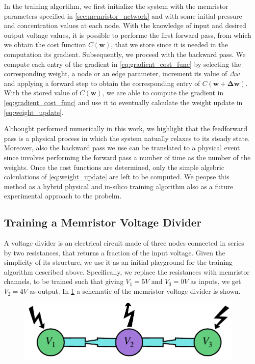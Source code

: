 \documentclass[reprint,superscriptaddress,prb,showkeys]{revtex4-2}
\newcommand{\brac}[1]{\left(#1 \right)} %
\begin{document}
In the training algortihm, we first initialize the system with the memristor parameters specified in \cref{sec:memristor_network} and with some initial pressure and concentration values at each node. With the knowledge of input and desired output voltage values, it is possible to performe the first forward pass, from which we obtain the cost function $C\brac{\boldsymbol{w}}$, that we store since it is needed in the computation its gradient. Subsequently, we proceed with the backward pass. We compute each entry of the gradient in \cref{eq:gradient_cost_func} by selecting the corresponding weight, a node or an edge parameter, increment its value of $\Delta w$ and applying a forward step to obtain the corresponding entry of $C\brac{\boldsymbol{w}+\boldsymbol{\Delta w}}$. With the stored value of $C\brac{\boldsymbol{w}}$, we are able to compute the gradient in \cref{eq:gradient_cost_func} and use it to eventually calculate the weight update in \cref{eq:weight_update}.

Althought performed numerically in this work, we highlight that the feedforward pass is a physical process in which the system natually relaxes to its steady state. Moreover, also the backward pass we use can be translated to a physical event since involves performing the forward pass a number of time as the number of the weights. Once the cost functions are determined, only the simple algebric calculations of \cref{eq:weight_update} are left to be computed. We peopse this method as a hybrid physical and in-silico training algorithm also as a future experimental approach to the probelm.

\subsection{Training a Memristor Voltage Divider}

A voltage divider is an electrical circuit made of three nodes connected in series by two resistances, that returns a fraction of the input voltage. Given the simplicity of its structure, we use it as an initial playground for the training algorithm described above. Specifically, we replace the resistances with memristor channels, to be trained such that giving $V_1 = 5V$ and $V_3 = 0V$ as inputs, we get $V_2 = 4V$ as output. In \cref{fig:vd_scheme} a schematic of the memristor voltage divider is shown.

\begin{figure}[h]
    \centering
    \includegraphics[width=0.8\columnwidth]{plots/voltage_divider/vd_scheme.pdf}
    \caption{}\label{fig:vd_scheme}
\end{figure} 
\end{document}
